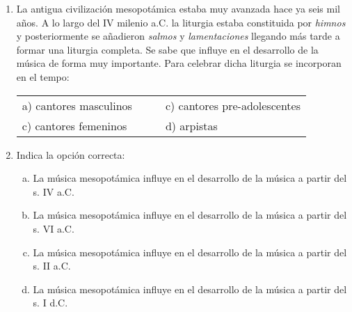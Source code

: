 \documentclass[letterpaper,12pt,notitlepage,spanish]{article}
\begin{document}
\begin{ejercicio}
	\begin{enumerate}
%
%
		\item La antigua civilización mesopotámica estaba muy avanzada hace ya seis mil años. A lo largo del IV milenio a.C. la liturgia estaba constituida por \textit{himnos} y posteriormente se añadieron \textit{salmos} y \textit{lamentaciones} llegando más tarde a formar una liturgia completa. Se sabe que influye en el desarrollo de la música de forma muy importante. Para celebrar dicha liturgia se incorporan en el tempo:
		\par
%		
%		
	\begin{tabular}{llll}
		a) cantores masculinos &  &  & c) cantores pre-adolescentes\\
		c) cantores femeninos & & & d) arpistas \\
%
%
	\end{tabular}

%
%
	\item Indica la opción correcta:
%
		\begin{enumerate}[a)]
			\item La música mesopotámica influye en el desarrollo de la música a partir del s. IV a.C.
			\item La música mesopotámica influye en el desarrollo de la música a partir del s. VI a.C. 
			\item La música mesopotámica influye en el desarrollo de la música a partir del s. II a.C. 
			\item La música mesopotámica influye en el desarrollo de la música a partir del s. I d.C.
		\end{enumerate}
%
%
	\end{enumerate}
\end{ejercicio}
%
%
%
\end{document}
